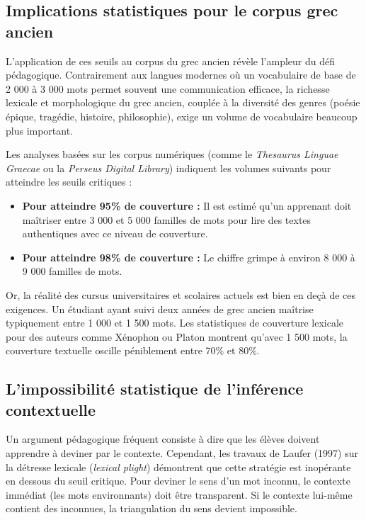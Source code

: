 {\subsection{Implications statistiques pour le corpus grec ancien}

L'application de ces seuils au corpus du grec ancien révèle l'ampleur du défi pédagogique.
Contrairement aux langues modernes où un vocabulaire de base de 2 000 à 3 000 mots permet souvent
une communication efficace, la richesse lexicale et morphologique du grec ancien, couplée à la
diversité des genres (poésie épique, tragédie, histoire, philosophie), exige un volume de
vocabulaire beaucoup plus important.

Les analyses basées sur les corpus numériques (comme le \textit{Thesaurus Linguae Graecae} ou la
\textit{Perseus Digital Library}) indiquent les volumes suivants pour atteindre les seuils critiques
:

\begin{itemize}\item \textbf{Pour atteindre 95\% de couverture :} Il est estimé qu'un apprenant doit maîtriser entre 3 000 et 5 000 familles de mots pour lire des textes authentiques avec ce niveau de couverture.\cite{II-3-2-ref9}\item \textbf{Pour atteindre 98\% de couverture :} Le chiffre grimpe à environ 8 000 à 9 000 familles de mots.\cite{II-3-2-ref9}\end{itemize}Or, la réalité des cursus universitaires et scolaires actuels est bien en deçà de ces exigences. Un
étudiant ayant suivi deux années de grec ancien maîtrise typiquement entre 1 000 et 1 500 mots. Les
statistiques de couverture lexicale pour des auteurs comme Xénophon ou Platon montrent qu'avec 1 500
mots, la couverture textuelle oscille péniblement entre 70\% et 80\%.\cite{II-3-2-ref12}



\subsection{L'impossibilité statistique de l'inférence contextuelle}

Un argument pédagogique fréquent consiste à dire que les élèves doivent apprendre à \og deviner par
le contexte\fg{}. Cependant, les travaux de Laufer (1997) sur la \og détresse lexicale\fg{}
(\textit{lexical plight}) démontrent que cette stratégie est inopérante en dessous du seuil
critique. Pour deviner le sens d'un mot inconnu, le contexte immédiat (les mots environnants) doit
être transparent. Si le contexte lui-même contient des inconnues, la triangulation du sens devient
impossible.

}
